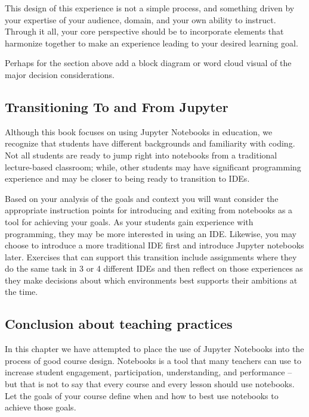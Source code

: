 \documentclass[]{book}
\begin{document}
This design of this experience is not a simple process, and something
driven by your expertise of your audience, domain, and your own ability
to instruct. Through it all, your core perspective should be to
incorporate elements that harmonize together to make an experience
leading to your desired learning goal.

Perhaps for the section above add a block diagram or word cloud visual
of the major decision considerations.

\subsection{Transitioning To and From
Jupyter}\label{transitioning-to-and-from-jupyter}

Although this book focuses on using Jupyter Notebooks in education, we
recognize that students have different backgrounds and familiarity with
coding. Not all students are ready to jump right into notebooks from a
traditional lecture-based classroom; while, other students may have
significant programming experience and may be closer to being ready to
transition to IDEs.

Based on your analysis of the goals and context you will want consider
the appropriate instruction points for introducing and exiting from
notebooks as a tool for achieving your goals. As your students gain
experience with programming, they may be more interested in using an
IDE. Likewise, you may choose to introduce a more traditional IDE first
and introduce Jupyter notebooks later. Exercises that can support this
transition include assignments where they do the same task in 3 or 4
different IDEs and then reflect on those experiences as they make
decisions about which environments best supports their ambitions at the
time.

\subsection{Conclusion about teaching
practices}\label{conclusion-about-teaching-practices}

In this chapter we have attempted to place the use of Jupyter Notebooks
into the process of good course design. Notebooks is a tool that many
teachers can use to increase student engagement, participation,
understanding, and performance -- but that is not to say that every
course and every lesson should use notebooks. Let the goals of your
course define when and how to best use notebooks to achieve those goals.
\end{document}
